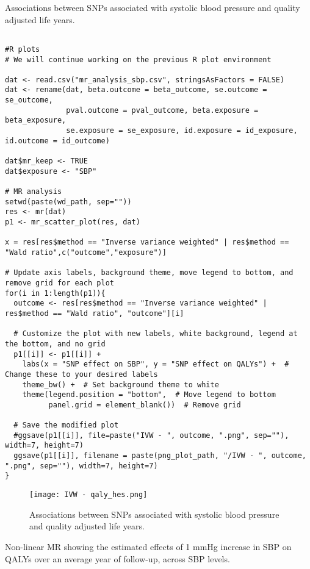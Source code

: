 \documentclass[11pt]{article}
\newcounter{subsubsubsection}[subsubsection]
\begin{document}
Associations between SNPs associated with systolic blood pressure and quality adjusted life years. 
\begin{lstlisting}[style=Rstyle]

#R plots 
# We will continue working on the previous R plot environment

dat <- read.csv("mr_analysis_sbp.csv", stringsAsFactors = FALSE)
dat <- rename(dat, beta.outcome = beta_outcome, se.outcome = se_outcome,
              pval.outcome = pval_outcome, beta.exposure = beta_exposure,
              se.exposure = se_exposure, id.exposure = id_exposure, id.outcome = id_outcome)

dat$mr_keep <- TRUE
dat$exposure <- "SBP"

# MR analysis
setwd(paste(wd_path, sep=""))
res <- mr(dat)
p1 <- mr_scatter_plot(res, dat)

x = res[res$method == "Inverse variance weighted" | res$method == "Wald ratio",c("outcome","exposure")]

# Update axis labels, background theme, move legend to bottom, and remove grid for each plot
for(i in 1:length(p1)){
  outcome <- res[res$method == "Inverse variance weighted" | res$method == "Wald ratio", "outcome"][i]
  
  # Customize the plot with new labels, white background, legend at the bottom, and no grid
  p1[[i]] <- p1[[i]] +
    labs(x = "SNP effect on SBP", y = "SNP effect on QALYs") +  # Change these to your desired labels
    theme_bw() +  # Set background theme to white
    theme(legend.position = "bottom",  # Move legend to bottom
          panel.grid = element_blank())  # Remove grid
  
  # Save the modified plot
  #ggsave(p1[[i]], file=paste("IVW - ", outcome, ".png", sep=""), width=7, height=7)
  ggsave(p1[[i]], filename = paste(png_plot_path, "/IVW - ", outcome, ".png", sep=""), width=7, height=7)
}

\end{lstlisting}
\begin{figure}[htbp]
  \centering
  \texttt{[image: IVW - qaly\_hes.png]}
  \caption{Associations between SNPs associated with systolic blood pressure and quality adjusted life years. }
  \label{fig:4}
\end{figure}
\color{black}
\newpage
{}

Non-linear MR showing the estimated effects of 1 mmHg increase in SBP on QALYs over an average year of follow-up, across SBP levels. 
\end{document}
